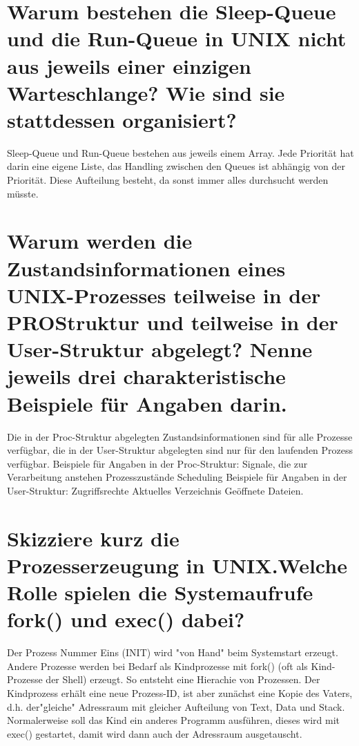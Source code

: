 \documentclass[12pt,a4paper,ngerman]{scrartcl}
\newcommand{\question}[1]{#1}
\newenvironment {answer}
                {}
                {}
\begin{document}
\section{\question{Warum bestehen die Sleep-Queue und die Run-Queue in UNIX nicht aus jeweils einer
einzigen Warteschlange? Wie sind sie stattdessen organisiert?}}
\begin{answer}
Sleep-Queue und Run-Queue bestehen aus jeweils einem Array. Jede Priorität hat darin
eine eigene Liste, das Handling zwischen den Queues ist abhängig von der Priorität. Diese
Aufteilung besteht, da sonst immer alles durchsucht werden müsste.
\end{answer}

\section{\question{Warum werden die Zustandsinformationen eines UNIX-Prozesses teilweise in der PROStruktur
und teilweise in der User-Struktur abgelegt? Nenne jeweils drei charakteristische
Beispiele für Angaben darin.}}
\begin{answer}
Die in der Proc-Struktur abgelegten Zustandsinformationen sind für alle Prozesse verfügbar,
die in der User-Struktur abgelegten sind nur für den laufenden Prozess verfügbar.
Beispiele für Angaben in der Proc-Struktur:
Signale, die zur Verarbeitung anstehen
Prozesszustände
Scheduling
Beispiele für Angaben in der User-Struktur:
Zugriffsrechte
Aktuelles Verzeichnis
Geöffnete Dateien.
\end{answer}

\section{\question{Skizziere kurz die Prozesserzeugung in UNIX.Welche Rolle spielen die Systemaufrufe fork()
und exec() dabei?}}
\begin{answer}
Der Prozess Nummer Eins (INIT) wird "von Hand" beim Systemstart erzeugt.
Andere Prozesse werden bei Bedarf als Kindprozesse mit fork() (oft als Kind-Prozesse
der Shell) erzeugt. So entsteht eine Hierachie von Prozessen. Der Kindprozess erhält eine
neue Prozess-ID, ist aber zunächst eine Kopie des Vaters, d.h. der"gleiche" Adressraum
mit gleicher Aufteilung von Text, Data und Stack. Normalerweise soll das Kind ein anderes
Programm ausführen, dieses wird mit exec() gestartet, damit wird dann auch der
Adressraum ausgetauscht.
\end{answer}
\end{document}
